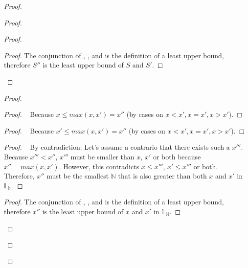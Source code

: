 \documentclass[10pt, oneside]{article}   	%
\begin{document}
\begin{proof}
\begin{proof}
\begin{proof}
			\qedstep
			\begin{proof}
				The conjunction of , , and  is the definition of a least upper bound, therefore $S''$ is the least upper bound of $S$ and $S'$.	
			\end{proof}
		\end{proof}
		
\begin{proof}
			\begin{proof}
				\pf~ Because $x \leq \textit{max}(x,x') = x''$ (by cases on $x<x', x=x', x>x'$).
			\end{proof}
			
			\begin{proof}
				\pf~ Because $x' \leq \textit{max}(x,x') = x''$ (by cases on $x<x', x=x', x>x'$).
			\end{proof}
			
			\begin{proof}
				\pf~ By contradiction: Let's assume a contrario that there exists such a $x'''$. Because $x''' < x''$, $x'''$ must be smaller than $x$, $x'$ or both because $x'' = \textit{max}(x,x')$. However, this contradicts $ x \leq x'''$,  $x' \leq x'''$ or both. Therefore, $x''$ must be the smallest $\mathds{N}$ that is also greater than both $x$ and $x'$ in $\mathds{L}_\mathds{N}$.
			\end{proof}

			\qedstep
			\begin{proof}
				The conjunction of , , and  is the definition of a least upper bound, therefore $x''$ is the least upper bound of $x$ and $x'$ in $\mathds{L}_\mathds{N}$.	
			\end{proof}
		\end{proof}
		

\end{proof}
\end{proof}
\end{document}
